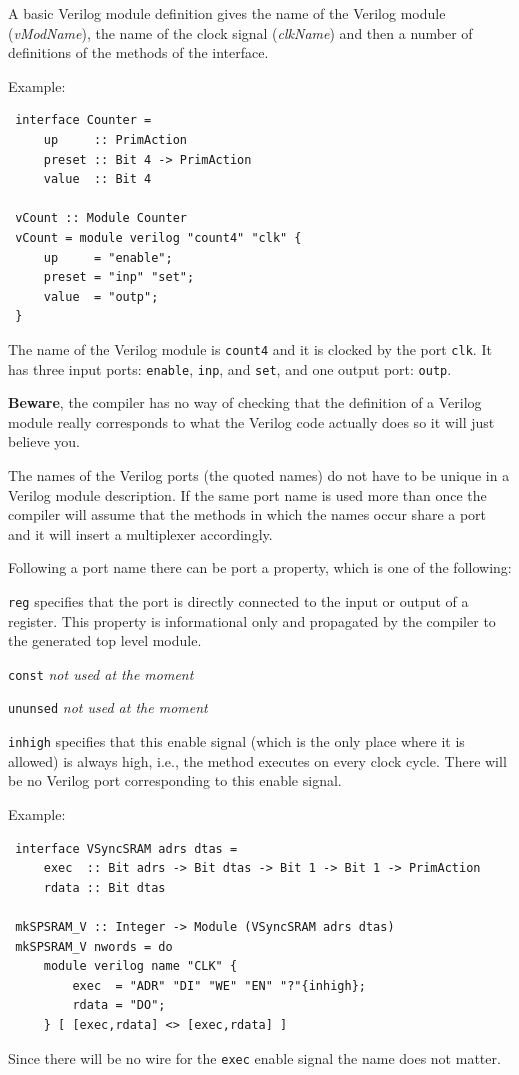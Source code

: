 \documentclass[twoside,letterpaper]{article}
\newcommand{\hm}{\hspace*{1em}}
\newcommand{\veri}{Verilog}
\newenvironment{NOTE}{%
  \hm{\bf{Note}}
  \begin{list}{$\bullet$}{%
    \setlength{\topsep}{0in}
    \setlength{\partopsep}{0in}
    \setlength{\itemsep}{0in}
    \setlength{\parsep}{0in}
    \setlength{\leftmargin}{2em}
    \setlength{\rightmargin}{0in}
    \setlength{\itemindent}{0in}
  }\item[]
  \sf
 }
 {\end{list}\hm{\bf{End of Note}}}
\newcommand{\te}[1]{\texttt{#1}}
\newcommand{\nterm}[1]{\emph{#1}}
\newcommand{\term}[1]{{\tt{#1}}}
\newcommand{\begindescrlist}[1]{
\begin{list}{\arabic{enumi}}{
                \settowidth{\labelwidth}{#1}
                \setlength{\leftmargin}{\labelwidth} %
                \addtolength{\leftmargin}{\labelsep}
                \setlength{\parsep}{0ex}
                \setlength{\itemsep}{0ex}
                \usecounter{enumi}
        }
}
\newcommand{\litem}[1]{\item[#1\hfill]}
\begin{document}
A basic {\veri} module definition gives the name of the {\veri} module
({\nterm{vModName}}), the name of the clock signal ({\nterm{clkName}})
and then a number of definitions of the methods of the interface.

Example:
\begin{verbatim}
 interface Counter =
     up     :: PrimAction
     preset :: Bit 4 -> PrimAction
     value  :: Bit 4

 vCount :: Module Counter
 vCount = module verilog "count4" "clk" {
     up     = "enable";
     preset = "inp" "set";
     value  = "outp";
 }
\end{verbatim}
The name of the {\veri} module is \te{count4} and it is clocked by the
port \te{clk}.  It has three input ports: \te{enable}, \te{inp}, and \te{set},
and one output port: \te{outp}.

{\bf Beware}, the compiler has no way of checking that the definition of
a {\veri} module really corresponds to what the {\veri} code actually does
so it will just believe you.

The names of the {\veri} ports (the quoted names) do not have to be unique
in a {\veri} module description.  If the same port name is used more than
once the compiler will assume that the methods in which the names occur
share a port and it will insert a multiplexer accordingly.

Following a port name there can be port a property,
which is one of the following:
\begindescrlist{xxxxxxx}
\litem{\te{reg}}
specifies that the port is directly connected
to the input or output of a register.  This property is informational only
and propagated by the compiler to the generated top level module.
\litem{\te{const}}
{\em not used at the moment}
\litem{\te{ununsed}}
{\em not used at the moment}
\litem{\te{inhigh}}
specifies that this enable signal (which is the only place where it is allowed) is always
high, i.e., the method executes on every clock cycle.  There will be no {\veri} port corresponding
to this enable signal.
\end{list}


Example:
\begin{verbatim}
 interface VSyncSRAM adrs dtas =
     exec  :: Bit adrs -> Bit dtas -> Bit 1 -> Bit 1 -> PrimAction
     rdata :: Bit dtas

 mkSPSRAM_V :: Integer -> Module (VSyncSRAM adrs dtas)
 mkSPSRAM_V nwords = do
     module verilog name "CLK" {
         exec  = "ADR" "DI" "WE" "EN" "?"{inhigh};
         rdata = "DO";
     } [ [exec,rdata] <> [exec,rdata] ]
\end{verbatim}
Since there will be no wire for the \term{exec} enable signal the name
does not matter.
\end{document}
